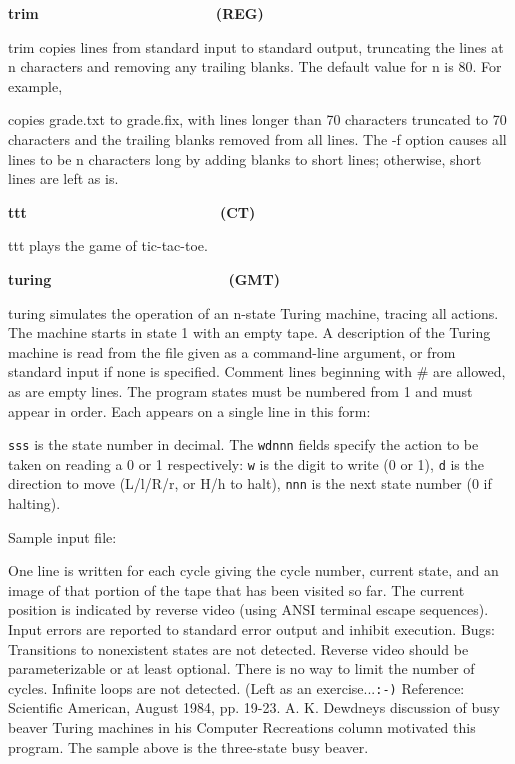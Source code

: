 {\sffamily\bfseries
trim\ \ \ \ \ \ \ \ \ \ \ \ \ \ \ \ \ \ \ \ \ \ (REG)}

\textsf{trim} copies lines from standard input to standard output,
truncating the lines at n characters and removing any trailing blanks.
The default value for n is 80. For example,


copies \textsf{grade.txt} to \textsf{grade.fix}, with lines longer than
70 characters truncated to 70 characters and the trailing blanks
removed from all lines. The \textsf{{}-f} option causes all lines to be
n characters long by adding blanks to short lines; otherwise, short
lines are left as is.

{\sffamily\bfseries
ttt\ \ \ \ \ \ \ \ \ \ \ \ \ \ \ \ \ \ \ \ \ \  \ \ (CT)}

\textsf{ttt} plays the game of tic-tac-toe.

{\sffamily\bfseries
turing\ \ \ \ \ \ \ \ \ \ \ \ \ \ \ \ \ \ \ \ \ \ (GMT)}

\textsf{turing} simulates the operation of an n-state Turing machine, tracing all actions. The machine starts in
state 1 with an empty tape. A description of the Turing machine is read
from the file given as a command-line argument, or from standard input
if none is specified. Comment lines beginning with
{\textquotesingle}\#{\textquotesingle} are allowed, as are empty lines.
The program states must be numbered from 1 and must appear in order.
Each appears on a single line in this form:


\texttt{sss} is the state number in decimal. The \texttt{wdnnn} fields
specify the action to be taken on reading a 0 or 1 respectively:
\texttt{w} is the digit to write (0 or 1), \texttt{d} is the direction
to move (L/l/R/r, or H/h to halt), \texttt{nnn} is the next state
number (0 if halting).

Sample input file:




One line is written for each cycle giving the cycle number, current
state, and an image of that portion of the tape that has been visited
so far. The current position is indicated by reverse video (using ANSI
terminal escape sequences). Input errors are reported to standard error
output and inhibit execution. Bugs: Transitions to nonexistent states
are not detected. Reverse video should be parameterizable or at least
optional. There is no way to limit the number of cycles. Infinite loops
are not detected. (Left as an exercise...\texttt{:-)} Reference:
Scientific American, August 1984, pp. 19-23. A. K.
Dewdney{\textquotesingle}s discussion of {\textquotedbl}busy
beaver{\textquotedbl} Turing machines in his {\textquotedbl}Computer
Recreations{\textquotedbl} column motivated this program. The sample
above is the three-state busy beaver.


